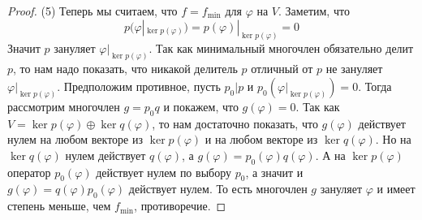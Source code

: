 \begin{proof}
(5) Теперь мы считаем, что $f = f_\text{min}$ для $\varphi$ на $V$.
Заметим, что
\[
p(\varphi|_{\ker p(\varphi)}) = p(\varphi)|_{\ker p(\varphi)} = 0
\]
Значит $p$ зануляет $\varphi|_{\ker p(\varphi)}$.
Так как минимальный многочлен обязательно делит $p$, то нам надо показать, что никакой делитель $p$ отличный от $p$ не зануляет $\varphi|_{\ker p(\varphi)}$.
Предположим противное, пусть $p_0 | p$ и $p_0(\varphi|_{\ker p(\varphi)}) = 0$.
Тогда рассмотрим многочлен $g = p_0 q$ и покажем, что $g(\varphi) = 0$.
Так как $V = \ker p(\varphi) \oplus \ker q(\varphi)$, то нам достаточно показать, что  $g(\varphi)$ действует нулем на любом векторе из $\ker p(\varphi)$ и на любом векторе из $\ker q(\varphi)$.
Но на $\ker q(\varphi)$ нулем действует $q(\varphi)$, а $g(\varphi) = p_0(\varphi)q(\varphi)$.
А на $\ker p(\varphi)$ оператор $p_0(\varphi)$ действует нулем по выбору $p_0$, а значит и $g(\varphi) = q(\varphi) p_0(\varphi)$ действует нулем.
То есть многочлен $g$ зануляет $\varphi$ и имеет степень меньше, чем $f_\text{min}$, противоречие.
\end{proof}

